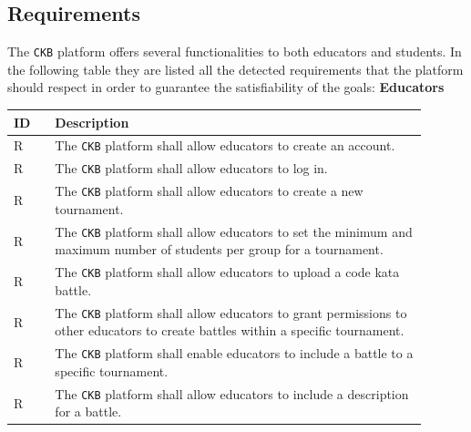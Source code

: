 \subsection{Requirements}
\label{subsec: requirements}%
The \verb|CKB| platform offers several functionalities to both educators and students.
In the following table they are listed all the detected requirements that the platform should respect in order to guarantee
the satisfiability of the goals:
\newpage
{}
\setcounter{req}{1}
\newcommand{\creq}{\thereq\stepcounter{req}}
\textbf{Educators}
\begin{center}
    \begin{longtable}{|l|p{0.9\linewidth}|}
        \hline
        \textbf{ID} & \textbf{Description}                                                                                                                             \\
        \hline
        R\creq      & The \verb|CKB| platform shall allow educators to create an account.                                                                    \\
        \hline
        R\creq      & The \verb|CKB| platform shall allow educators to log in.                                                                                 \\
        \hline
        R\creq      & The \verb|CKB| platform shall allow educators to create a new tournament.                                                                \\
        \hline
        R\creq      & The \verb|CKB| platform shall allow educators to set the minimum and maximum number of students per group for a tournament.                                                        \\
        \hline
        R\creq      & The \verb|CKB| platform shall allow educators to upload a code kata battle.                                                                         \\
        \hline
        R\creq      & The \verb|CKB| platform shall allow educators to grant permissions to other educators to create battles within a specific tournament.                                                      \\
        \hline
        R\creq      & The \verb|CKB| platform shall enable educators to include a battle to a specific tournament.                                                      \\
        \hline
        R\creq      & The \verb|CKB| platform shall allow educators to include a description for a battle.                                                                \\

\end{longtable}
\end{center}
